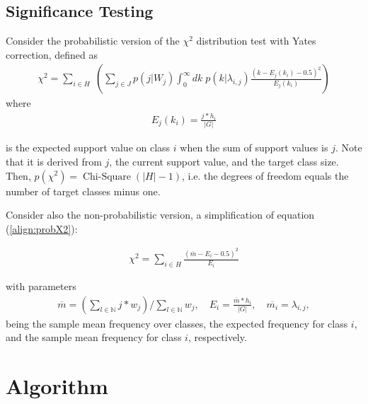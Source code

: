 \documentclass{article}
\begin{document}
\subsection{Significance Testing}
\label{ss:significanceTesting}
Consider the probabilistic version of the $\chi^2$ distribution test with Yates correction, defined as
\begin{align}
  \label{align:probX2}
  \chi^2 = \sum_{i \in H}\; \left( \sum_{j \in J}p(j|W_j) \int_0^{\infty}dk\; p(k|\lambda_{i,j}) \frac{(k-E_j(k_i)-0.5)^2}{E_j(k_i)} \right)
\end{align}
where 
\begin{align}
  E_j(k_i) = \frac{j * h_i}{\vert G\vert}
\end{align}

is the expected support value on class $i$ when the sum of support values is $j$. Note that it is derived from $j$, the current support value, and the target class size. Then, $p(\chi^2)=\operatorname{Chi-Square}\left(\vert H\vert-1\right)$, i.e. the degrees of freedom equals the number of target classes minus one.

Consider also the non-probabilistic version, a simplification of equation (\ref{align:probX2}):

\begin{align}
  \label{align:ordX2}
  \chi^2 = \sum_{i \in H} \frac{(\overline{m}-E_i-0.5)^2}{E_i} 
\end{align}

with parameters
\begin{align}
  \overline{m}=\left( \sum_{l \in \mathbb{N}} j*w_{j} \right) / \sum_{l \in \mathbb{N}} w_{j}, \quad E_i = \frac{\overline{m} * h_i}{\vert G\vert}, \quad \overline{m_i}=\lambda_{i,j},
\end{align}
being the sample mean frequency over classes, the expected frequency for class $i$, and the sample mean frequency for class $i$, respectively.


\section{Algorithm}
\end{document}
